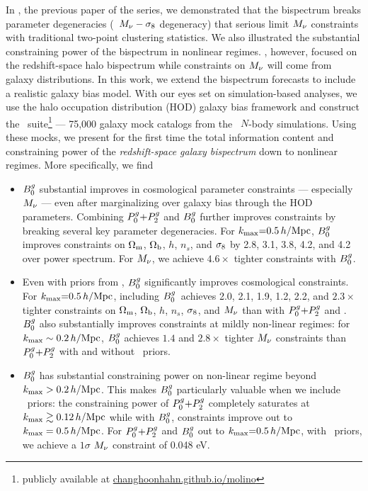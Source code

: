 In \cite{hahn2020}, the previous paper of the series, we demonstrated that the 
bispectrum breaks parameter degeneracies (\eg~$M_\nu-\sigma_8$ degeneracy) that 
serious limit $M_\nu$ constraints with traditional two-point clustering statistics. 
We also illustrated the substantial constraining power of the bispectrum in nonlinear regimes.
\cite{hahn2020}, however, focused on the redshift-space halo bispectrum while 
constraints on $M_\nu$ will come from galaxy distributions. %
In this work, we extend the \cite{hahn2020} bispectrum forecasts to
include a realistic galaxy bias model. With our eyes set on
simulation-based analyses, we use the halo occupation distribution (HOD) galaxy
bias framework and construct the \molino~suite\footnote{publicly available at
\href{changhoonhahn.github.io/molino}{changhoonhahn.github.io/molino}} ---
75,000 galaxy mock catalogs from the \quij~$N$-body 
simulations.  
Using these mocks, we present for the first time the total information
content and constraining power of the {\em redshift-space galaxy bispectrum} 
down to nonlinear regimes. More specifically, we find
\begin{itemize}
    \item $B^g_0$ substantial improves in cosmological parameter constraints ---
        especially $M_\nu$ --- even after marginalizing over galaxy bias through
        the HOD parameters. Combining $P^g_0{+}P^g_2$ and $B^g_0$ further improves
        constraints by breaking several key parameter degeneracies. For 
        $k_{\rm max}{=}0.5\,h/\mathrm{Mpc}$, $B^g_0$ improves constraints on 
        $\Omega_{\rm m}$, $\Omega_{\rm b}$, $h$, $n_s$, and $\sigma_8$ by 2.8, 3.1, 3.8, 4.2, and 4.2
        over power spectrum. For $M_\nu$, we achieve $4.6\times$ 
        tighter constraints with $B^g_0$.

    \item Even with priors from \planck, $B^g_0$ significantly improves
        cosmological constraints. For $k_{\rm max}{=}0.5\,h/\mathrm{Mpc}$, including 
        $B^g_0$~achieves 2.0, 2.1, 1.9, 1.2, 2.2, and $2.3\times$ tighter
        constraints on $\Omega_{\rm m}$, $\Omega_{\rm b}$, $h$, $n_s$, $\sigma_8$, and $M_\nu$ than with $P^g_0{+}P^g_2$
        and \planck. $B^g_0$ also substantially improves constraints at mildly non-linear regimes:
        for $k_{\rm max}\sim0.2\,h/\mathrm{Mpc}$, $B^g_0$ achieves $1.4$ and $2.8\times$ tighter
        $M_\nu$ constraints than $P^g_0{+}P^g_2$ with and without \planck~priors. 

    \item $B^g_0$ has substantial constraining power on non-linear regime beyond
        $k_{\rm max} > 0.2\,h/\mathrm{Mpc}$. This makes $B^g_0$ particularly valuable when we include
        \planck~priors: the constraining power of $P^g_0{+}P^g_2$ completely saturates 
        at $k_{\rm max} \gtrsim 0.12\,h/\mathrm{Mpc}$ while with $B^g_0$, constraints improve out to 
        $k_{\rm max}=0.5\,h/\mathrm{Mpc}$. For $P^g_0{+}P^g_2$ and $B^g_0$ out to $k_{\rm max}{=}0.5\,h/\mathrm{Mpc}$, with
        \planck~priors, we achieve a $1\sigma$ $M_\nu$ constraint of 0.048 eV.
\end{itemize}

